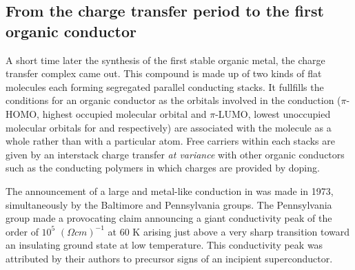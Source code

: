 \documentclass[11pt]{article} %
\begin{document}
\subsection{From the  charge transfer period to the first organic conductor}
\label{sec:1.1}
A short time later  the synthesis of the first stable organic metal, the charge transfer complex \ttftcnq came out. This compound is made up of two
kinds of flat molecules each forming  segregated parallel conducting stacks. It fullfills the conditions for an organic conductor
as the orbitals involved in the conduction ($\pi$-HOMO, highest occupied molecular orbital and $\pi$-LUMO, lowest unoccupied molecular orbitals for \ttf and
\tcnq respectively) are associated with the molecule as a whole rather than with a particular atom. Free carriers within each stacks are given 
 by an  interstack charge  transfer \textit{at variance} with other organic conductors such as the conducting polymers in which charges are provided by doping\cite{Shirakawa77}.


The announcement of a large and metal-like conduction in \ttftcnq was made in 1973, simultaneously  by the Baltimore\cite{Ferraris73}
and  Pennsylvania\cite{Coleman73} groups.  The Pennsylvania group made a provocating claim announcing  a giant conductivity peak of the
order of
$10^5$
$(\Omega cm)^{-1}$ at 60 K arising just above a very sharp transition toward an insulating ground state at low temperature. This
conductivity peak was attributed by their authors to precursor signs  of an incipient superconductor.  %

\end{document}
